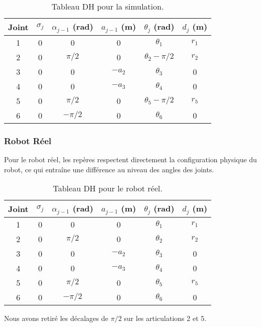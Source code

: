 \documentclass[a4paper,12pt]{article}
\begin{document}
\begin{table}[h!]
    \centering
    \begin{tabular}{|c|c|c|c|c|c|}
    \hline
    Joint & $\sigma_j$ & $\alpha_{j-1}$ (rad) & $a_{j-1}$ (m) & $\theta_j$ (rad) & $d_j$ (m) \\ \hline
    1 & 0 & 0 & 0 & $\theta_1$ & $r_1$ \\ \hline
    2 & 0 & $\pi/2$ & 0 & $\theta_2 - \pi/2$ & $r_2$ \\ \hline
    3 & 0 & 0 & $-a_2$ & $\theta_3$ & 0 \\ \hline
    4 & 0 & 0 & $-a_3$ & $\theta_4$ & 0 \\ \hline
    5 & 0 & $\pi/2$ & 0 & $\theta_5 - \pi/2$ & $r_5$ \\ \hline
    6 & 0 & $-\pi/2$ & 0 & $\theta_6$ & 0 \\ \hline
    \end{tabular}
    \caption{Tableau DH pour la simulation.}
\end{table}

\subsubsection{Robot Réel}
Pour le robot réel, les repères respectent directement la configuration physique du robot, ce qui entraîne une différence au niveau des angles des joints.  

\begin{table}[h!]
    \centering
    \begin{tabular}{|c|c|c|c|c|c|}
    \hline
    Joint & $\sigma_j$ & $\alpha_{j-1}$ (rad) & $a_{j-1}$ (m) & $\theta_j$ (rad) & $d_j$ (m) \\ \hline
    1 & 0 & 0 & 0 & $\theta_1$ & $r_1$ \\ \hline
    2 & 0 & $\pi/2$ & 0 & $\theta_2$ & $r_2$ \\ \hline
    3 & 0 & 0 & $-a_2$ & $\theta_3$ & 0 \\ \hline
    4 & 0 & 0 & $-a_3$ & $\theta_4$ & 0 \\ \hline
    5 & 0 & $\pi/2$ & 0 & $\theta_5$ & $r_5$ \\ \hline
    6 & 0 & $-\pi/2$ & 0 & $\theta_6$ & 0 \\ \hline
    \end{tabular}
    \caption{Tableau DH pour le robot réel.}
\end{table}

Nous avons retiré les décalages de $\pi/2$ sur les articulations 2 et 5.
\end{document}
